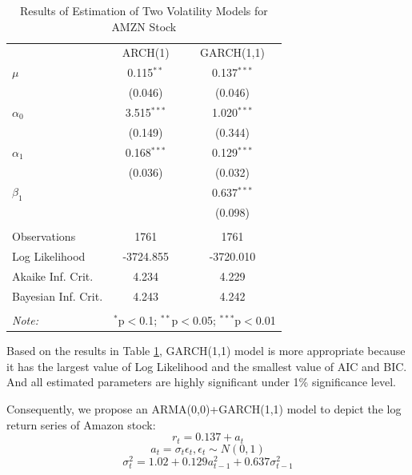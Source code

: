\documentclass[paper=a4, fontsize=11pt]{article}
\begin{document}
\begin{table}[!htbp] \centering 
  \caption{Results of Estimation of Two Volatility Models for AMZN Stock} 
  \label{est_AMZN} 
\begin{tabular}{@{\extracolsep{5pt}}lcc} 
\\[-1.8ex]\hline 
\hline
 & ARCH(1) & GARCH(1,1) \\ 
 $\mu$ & 0.115$^{**}$ & 0.137$^{***}$ \\ 
  & (0.046) & (0.046) \\ 
 $\alpha_0$ & 3.515$^{***}$ & 1.020$^{***}$ \\ 
  & (0.149) & (0.344) \\ 
 $\alpha_1$ & 0.168$^{***}$ & 0.129$^{***}$ \\ 
  & (0.036) & (0.032) \\ 
 $\beta_1$ &  & 0.637$^{***}$ \\ 
  &  & (0.098) \\ 
\hline \\[-1.8ex] 
Observations & 1761 & 1761 \\ 
Log Likelihood & -3724.855 & -3720.010 \\ 
Akaike Inf. Crit. & 4.234 & 4.229 \\ 
Bayesian Inf. Crit. & 4.243 & 4.242 \\ 
\hline 
\hline \\[-1.8ex] 
\textit{Note:}  & \multicolumn{2}{r}{$^{*}$p$<$0.1; $^{**}$p$<$0.05; $^{***}$p$<$0.01} \\ 
\end{tabular} 
\end{table} 

Based on the results in Table \ref{est_AMZN}, GARCH(1,1) model is more appropriate because it has the largest value of Log Likelihood and the smallest value of AIC and BIC. And all estimated parameters are highly significant under 1\% significance level.

Consequently, we propose an ARMA(0,0)+GARCH(1,1) model to depict the log return series of Amazon stock:
\[ r_t = 0.137+a_t\]
\[ a_t = \sigma_t \epsilon_t, \epsilon_t \sim N(0,1) \]
\[ \sigma_t^2 = 1.02+0.129a_{t-1}^2+0.637\sigma_{t-1}^2 \]
\end{document}
